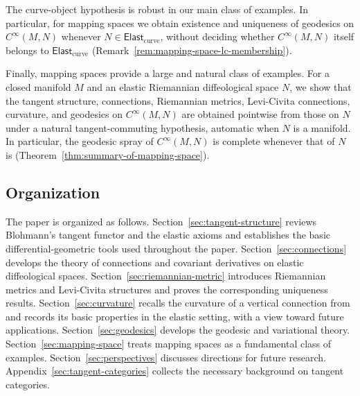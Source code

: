 \documentclass{amsart}
\theoremstyle{definition}
\begin{document}
The curve-object hypothesis is robust in our main class of examples. In particular, for mapping spaces we obtain existence and uniqueness of geodesics on $C^\infty(M,N)$ whenever $N \in \mathsf{Elast}_{\mathrm{curve}}$, without deciding whether $C^\infty(M,N)$ itself belongs to $\mathsf{Elast}_{\mathrm{curve}}$ (Remark~\ref{rem:mapping-space-lc-membership}).

Finally, mapping spaces provide a large and natural class of examples. For a closed manifold $M$ and an elastic Riemannian diffeological space $N$, we show that the tangent structure, connections, Riemannian metrics, Levi-Civita connections, curvature, and geodesics on $C^\infty(M,N)$ are obtained pointwise from those on $N$ under a natural tangent-commuting hypothesis, automatic when $N$ is a manifold. In particular, the geodesic spray of $C^\infty(M,N)$ is complete whenever that of $N$ is (Theorem~\ref{thm:summary-of-mapping-space}).

\subsection*{Organization}
The paper is organized as follows. Section~\ref{sec:tangent-structure} reviews Blohmann's tangent functor and the elastic axioms and establishes the basic differential-geometric tools used throughout the paper. Section~\ref{sec:connections} develops the theory of connections and covariant derivatives on elastic diffeological spaces. Section~\ref{sec:riemannian-metric} introduces Riemannian metrics and Levi-Civita structures and proves the corresponding uniqueness results. Section~\ref{sec:curvature} recalls the curvature of a vertical connection from \cite{CC17} and records its basic properties in the elastic setting, with a view toward future applications. Section~\ref{sec:geodesics} develops the geodesic and variational theory. Section~\ref{sec:mapping-space} treats mapping spaces as a fundamental class of examples. Section~\ref{sec:perspectives} discusses directions for future research. Appendix~\ref{sec:tangent-categories} collects the necessary background on tangent categories.
\end{document}

